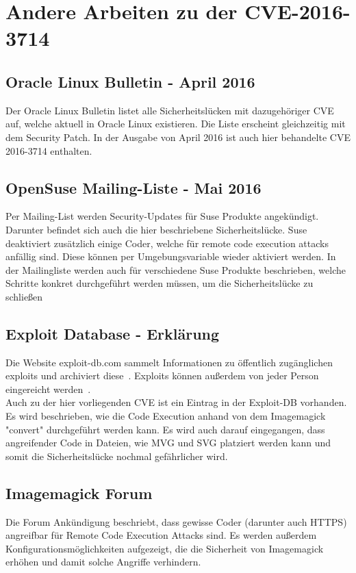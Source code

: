 \section{Andere Arbeiten zu der CVE-2016-3714}\label{sec:arbeiten-zu-der-cve-2016-3714}

\subsection{Oracle Linux Bulletin - April 2016~\cite{OracleLinuxBulletin}}\label{subsec:oracle-linux-bulletin---april-2016}

Der Oracle Linux Bulletin listet alle Sicherheitslücken mit dazugehöriger CVE auf,
welche aktuell in Oracle Linux existieren.
Die Liste erscheint gleichzeitig mit dem Security Patch.
In der Ausgabe von April 2016 ist auch hier behandelte CVE 2016-3714 enthalten.


\subsection{OpenSuse Mailing-Liste - Mai 2016~\cite{SecurityannounceSUSESU201612751}}\label{subsec:opensuse-mailing-liste---may-2016}

Per Mailing-List werden Security-Updates für Suse Produkte angekündigt.
Darunter befindet sich auch die hier beschriebene Sicherheitslücke.
Suse deaktiviert zusätzlich einige Coder, welche für remote code execution attacks anfällig sind.
Diese können per Umgebungsvariable wieder aktiviert werden.
In der Mailingliste werden auch für verschiedene Suse Produkte beschrieben,
welche Schritte konkret durchgeführt werden müssen, um die Sicherheitslücke zu schließen


\subsection{Exploit Database - Erklärung~\cite{ExploitDBErklaerung}}\label{subsec:exploit-database:-erklaerung}

Die Website exploit-db.com sammelt Informationen zu öffentlich zugänglichen exploits und archiviert diese~\cite{ExploitDBFaq}.
Exploits können außerdem von jeder Person eingereicht werden~\cite{ExploitDbSubmit}.\\

Auch zu der hier vorliegenden CVE ist ein Eintrag in der Exploit-DB vorhanden.
Es wird beschrieben, wie die Code Execution anhand von dem Imagemagick "convert" durchgeführt werden kann.
Es wird auch darauf eingegangen, dass angreifender Code in Dateien,
wie MVG und SVG platziert werden kann und somit die Sicherheitslücke nochmal gefährlicher wird.


\subsection{Imagemagick Forum~\cite{ImageMagickSecurityIssue}}\label{subsec:imagemagick-forum}

Die Forum Ankündigung beschriebt,
dass gewisse Coder (darunter auch HTTPS) angreifbar für Remote Code Execution Attacks sind.
Es werden außerdem Konfigurationsmöglichkeiten aufgezeigt,
die die Sicherheit von Imagemagick erhöhen und damit solche Angriffe verhindern.
